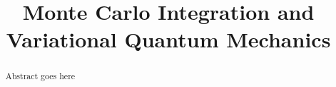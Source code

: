 \documentclass[conference]{IEEEtran}
\begin{document}
\title{Monte Carlo Integration and Variational Quantum Mechanics}


\author{
\and
{}
\and
{}
}


\maketitle


\begin{abstract}

Abstract goes here

\end{abstract}

\IEEEpeerreviewmaketitle














\end{document}
